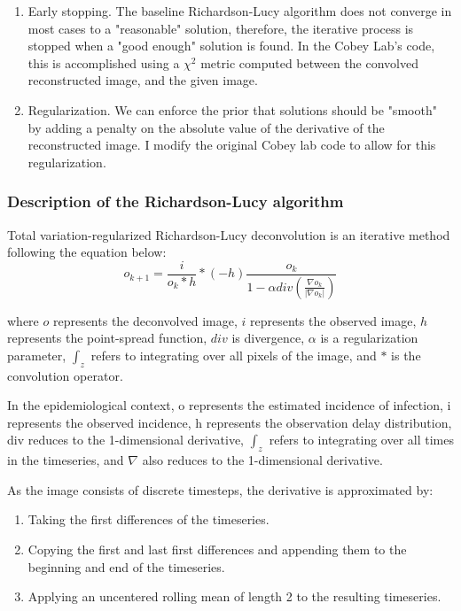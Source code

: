 \documentclass{article}
\begin{document}
\begin{enumerate}
	\item Early stopping. The baseline Richardson-Lucy algorithm does not converge in most cases to a "reasonable" solution, therefore, the iterative process is stopped when a "good enough" solution is found. In the Cobey Lab's code, this is accomplished using a $\chi^2$ metric computed between the convolved reconstructed image, and the given image. 
	 \item Regularization. We can enforce the prior that solutions should be "smooth" by adding a penalty on the absolute value of the derivative of the reconstructed image. I modify the original Cobey lab code to allow for this regularization.
\end{enumerate}

\subsubsection{Description of the Richardson-Lucy algorithm}
Total variation-regularized Richardson-Lucy deconvolution is an iterative method following the equation below: \cite{RLLoss}
\begin{equation}
    o_{k+1} = \frac{i}{o_k * h} * (-h) \frac{o_k}{1-\alpha div(\frac{\nabla o_k}{|\nabla o_k|})}
\end{equation}

where $o$ represents the deconvolved image, $i$ represents the observed image, $h$ represents the point-spread function, $div$ is divergence, $\alpha$ is a regularization parameter, $\int_z$ refers to integrating over all pixels of the image, and $*$ is the convolution operator.

In the epidemiological context, o represents the estimated incidence of infection, i represents the observed incidence, h represents the observation delay distribution, div reduces to the 1-dimensional derivative, $\int_z$ refers to integrating over all times in the timeseries, and $\nabla$ also reduces to the 1-dimensional derivative.

As the image consists of discrete timesteps, the derivative is approximated by:
\begin{enumerate}
	\item Taking the first differences of the timeseries.
	\item Copying the first and last first differences and appending them to the beginning and end of the timeseries.
	\item Applying an uncentered rolling mean of length 2 to the resulting timeseries.
\end{enumerate}
\end{document}
